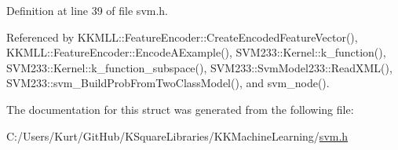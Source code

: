 Definition at line 39 of file svm.\+h.



Referenced by K\+K\+M\+L\+L\+::\+Feature\+Encoder\+::\+Create\+Encoded\+Feature\+Vector(), K\+K\+M\+L\+L\+::\+Feature\+Encoder\+::\+Encode\+A\+Example(), S\+V\+M233\+::\+Kernel\+::k\+\_\+function(), S\+V\+M233\+::\+Kernel\+::k\+\_\+function\+\_\+subspace(), S\+V\+M233\+::\+Svm\+Model233\+::\+Read\+X\+M\+L(), S\+V\+M233\+::svm\+\_\+\+Build\+Prob\+From\+Two\+Class\+Model(), and svm\+\_\+node().



The documentation for this struct was generated from the following file\+:\begin{DoxyCompactItemize}
\item 
C\+:/\+Users/\+Kurt/\+Git\+Hub/\+K\+Square\+Libraries/\+K\+K\+Machine\+Learning/\hyperlink{svm_8h}{svm.\+h}\end{DoxyCompactItemize}

